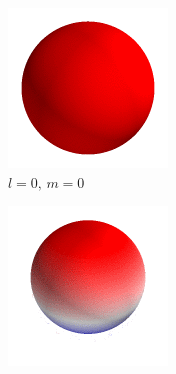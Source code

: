 \begin{figure}[ht]
    \begin{subfigure}[b]{0.2\linewidth}
        \includegraphics[width=\linewidth]{introduction/images/0_0.png}
        \caption*{$l=0,\,m=0$}
    \end{subfigure}%
    \begin{subfigure}[b]{0.2\linewidth}
        \includegraphics[width=\linewidth]{introduction/images/1_0.png}

\end{subfigure}
\end{figure}
